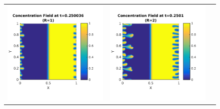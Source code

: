 \documentclass{article}
\begin{document}
\begin{enumerate}
\begin{figure}[!ht]
\centering
\begin{tabular}{c c c}
\includegraphics[scale=0.5]{conc10_25.png} &
\includegraphics[scale=0.5]{conc20_25.png} &

\end{tabular}
\end{figure}
\end{enumerate}
\end{document}

